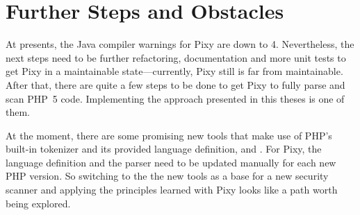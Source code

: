 \section{Further Steps and Obstacles}

At presents, the Java compiler warnings for Pixy are down to 4. Nevertheless, the next steps need to be further refactoring, documentation and more unit tests to get Pixy in a maintainable state---currently, Pixy still is far from maintainable. After that, there are quite a few steps to be done to get Pixy to fully parse and scan PHP~5 code. Implementing the approach presented in this theses is one of them.

At the moment, there are some promising new tools that make use of PHP's built-in tokenizer and its provided language definition, \eg \cite{php-parser-popov} and \cite{php-analyzer}. For Pixy, the language definition and the parser need to be updated manually for each new PHP version. So switching to the the new tools as a base for a new security scanner and applying the principles learned with Pixy looks like a path worth being explored.
